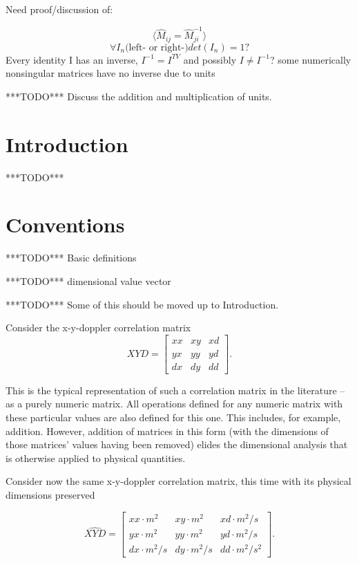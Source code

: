 \documentclass[10pt,letterpaper]{article}
\author{T. Zachary Laine}
\numberwithin{equation}{section}
\begin{document}
Need proof/discussion of:

\[ \langle \hat{M}_{ij} = \hat{M}^{-1}_{ji}\rangle \]
\[ \forall I_{n} \mbox{(left- or right-)} det(I_{n}) = 1 ? \]
Every identity I has an inverse, $I^{-1} = I^{TV}$ and possibly $I \not= I^{-1}$?
some numerically nonsingular matrices have no inverse due to units

***TODO*** Discuss the addition and multiplication of units.

\section{Introduction}

***TODO***

\section{Conventions}

***TODO*** Basic definitions

***TODO*** dimensional value vector

***TODO*** Some of this should be moved up to Introduction.

Consider the x-y-doppler correlation matrix
\[XYD = \left[ \begin{matrix}
xx & xy & xd \\ yx & yy & yd \\ dx & dy & dd
\end{matrix} \right]. \]

This is the typical representation of such a correlation matrix in the literature – as a purely numeric matrix.  All operations defined for any numeric matrix with these particular values are also defined for this one.  This includes, for example, addition.  However, addition of matrices in this form (with the dimensions of those matrices' values having been removed) elides the dimensional analysis that is otherwise applied to physical quantities.

Consider now the same x-y-doppler correlation matrix, this time with its physical dimensions preserved

\[ \widehat{XYD}= \left[ \begin{matrix}
  xx \cdot m^2 & xy \cdot m^2 & xd \cdot m^2/s \\
  yx \cdot m^2 & yy \cdot m^2 & yd \cdot m^2/s \\
  dx \cdot m^2/s & dy \cdot m^2/s & dd \cdot m^2/s^2
\end{matrix} \right]. \]
\end{document}
